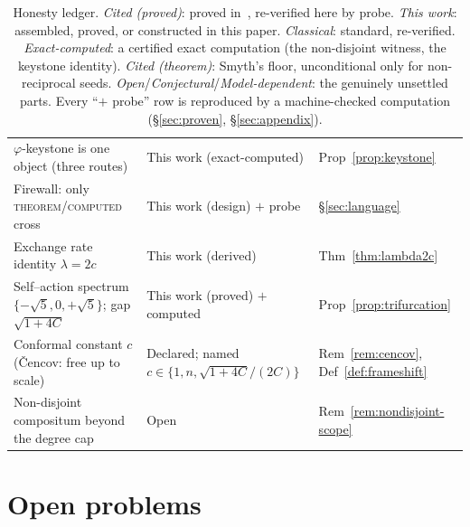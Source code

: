 \documentclass[11pt]{article}
\theoremstyle{plain}
\theoremstyle{definition}
\theoremstyle{remark}
\begin{document}
\begin{table}[ht]
\begin{tabular}{p{} l l}
$\varphi$-keystone is one object (three routes) & This work (exact-computed) & Prop~\ref{prop:keystone} \\
Firewall: only \textsc{theorem}/\textsc{computed} cross & This work (design) $+$ probe & \S\ref{sec:language} \\
Exchange rate identity $\lambda=2c$ & This work (derived) & Thm~\ref{thm:lambda2c} \\
Self--action spectrum $\{-\sqrt5,0,+\sqrt5\}$; gap $\sqrt{1+4C}$ & This work (proved) $+$ computed & Prop~\ref{prop:trifurcation} \\
Conformal constant $c$ (\v{C}encov: free up to scale) & Declared; named $c\in\{1,n,\sqrt{1+4C}/(2C)\}$ & Rem~\ref{rem:cencov}, Def~\ref{def:frameshift} \\
Non-disjoint compositum beyond the degree cap & Open & Rem~\ref{rem:nondisjoint-scope} \\
\bottomrule
\end{tabular}
\caption{Honesty ledger. \emph{Cited (proved)}: proved in~\cite{VectorSubstrate}, re-verified here by probe.
\emph{This work}: assembled, proved, or constructed in this paper. \emph{Classical}: standard, re-verified.
\emph{Exact-computed}: a certified exact computation (the non-disjoint witness, the keystone identity).
\emph{Cited (theorem)}: Smyth's floor, unconditional only for non-reciprocal seeds.
\emph{Open}/\emph{Conjectural}/\emph{Model-dependent}: the genuinely unsettled parts. Every ``$+$ probe'' row
is reproduced by a machine-checked computation (\S\ref{sec:proven}, \S\ref{sec:appendix}).}
\label{tab:ledger}
\end{table}

\section{Open problems}\label{sec:open}
\end{document}
